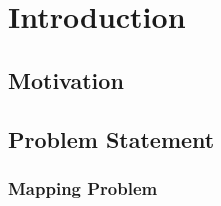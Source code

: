 
\chapter*{Introduction}
\label{sec:org49c4ae2}

\section*{Motivation}
\label{sec:orgb34791d}

\section*{Problem Statement}
\label{sec:orgaea9d52}

\subsection*{Mapping Problem}
\label{sec:org481fbf6}

